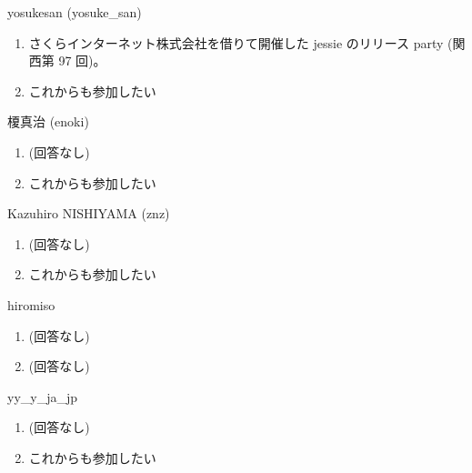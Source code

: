 \begin{prework}{ yosukesan (yosuke\_san) }
  \begin{enumerate}
  \item さくらインターネット株式会社を借りて開催した jessie のリリース party (関西第 97 回)。
  \item これからも参加したい
  \end{enumerate}
\end{prework}

\begin{prework}{ 榎真治 (enoki) }
  \begin{enumerate}
  \item (回答なし)
  \item これからも参加したい
  \end{enumerate}
\end{prework}

\begin{prework}{ Kazuhiro NISHIYAMA (znz) }
  \begin{enumerate}
  \item (回答なし)
  \item これからも参加したい
  \end{enumerate}
\end{prework}

\begin{prework}{ hiromiso }
  \begin{enumerate}
  \item (回答なし)
  \item (回答なし)
  \end{enumerate}
\end{prework}

\begin{prework}{ yy\_y\_ja\_jp }
  \begin{enumerate}
  \item (回答なし)
  \item これからも参加したい
  \end{enumerate}
\end{prework}
